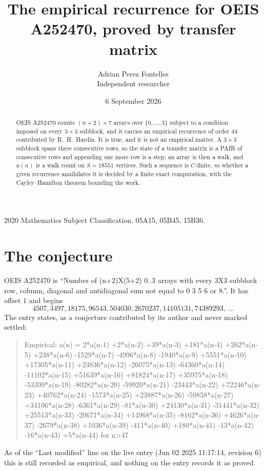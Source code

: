 \documentclass[11pt,a4paper]{article}
\title{The empirical recurrence for OEIS A252470, proved by transfer matrix}
\author{Adrian Perez Fontelles\\ \small Independent researcher}
\date{6 September 2026}
\theoremstyle{plain}
\theoremstyle{definition}
\begin{document}
\maketitle

\begin{abstract}
OEIS A252470 counts $(n+2)\times7$ arrays over $\{0,\dots,3\}$ subject to a condition imposed on
every $3\times3$ subblock, and it carries an empirical recurrence of order $44$
contributed by R.~H.~Hardin. It is true, and it is not an empirical matter. A $3\times3$
subblock spans three consecutive rows, so the state of a transfer matrix is a PAIR of
consecutive rows and appending one more row is a step; an array is then a walk, and
$a(n)$ is a walk count on $S=18551$ vertices. Such a sequence is $C$-finite, so whether a given
recurrence annihilates it is decided by a finite exact computation, with the Cayley--Hamilton
theorem bounding the work.
\end{abstract}

\noindent\small 2020 Mathematics Subject Classification. 05A15, 05B45, 15B36.\normalsize

\section{The conjecture}

OEIS A252470 is ``Number of (n+2)X(5+2) 0..3 arrays with every 3X3 subblock row, column, diagonal and antidiagonal sum not equal to 0 3 5 6 or 8.''. It has offset $1$ and begins
\[
4507, 3497, 18175, 96543, 504030, 2670237, 14105131, 74389293,\ \dots
\]
The entry states, as a conjecture contributed by its author and never marked settled:
\begin{quote}
Empirical: a(n) = 2*a(n-1) +2*a(n-2) +39*a(n-3) +181*a(n-4) +262*a(n-5) +238*a(n-6) -1529*a(n-7) -4996*a(n-8) -1940*a(n-9) +5551*a(n-10) +17305*a(n-11) +23836*a(n-12) -26075*a(n-13) -64360*a(n-14) -11102*a(n-15) +51639*a(n-16) +81824*a(n-17) +35975*a(n-18) -53399*a(n-19) -80282*a(n-20) -59920*a(n-21) -23443*a(n-22) +72246*a(n-23) +40762*a(n-24) -1573*a(n-25) +23887*a(n-26) -59858*a(n-27) +34106*a(n-28) -6361*a(n-29) -81*a(n-30) +24130*a(n-31) -31441*a(n-32) +25513*a(n-33) -20671*a(n-34) +14968*a(n-35) -8162*a(n-36) +4626*a(n-37) -2679*a(n-38) +1036*a(n-39) -411*a(n-40) +180*a(n-41) -13*a(n-42) -16*a(n-43) +5*a(n-44) for n>47
\end{quote}
As of the ``Last modified'' line on the live entry (Jun 02 2025 11:17:14, revision 6) this is still
recorded as empirical, and nothing on the entry records it as proved.
\end{document}
